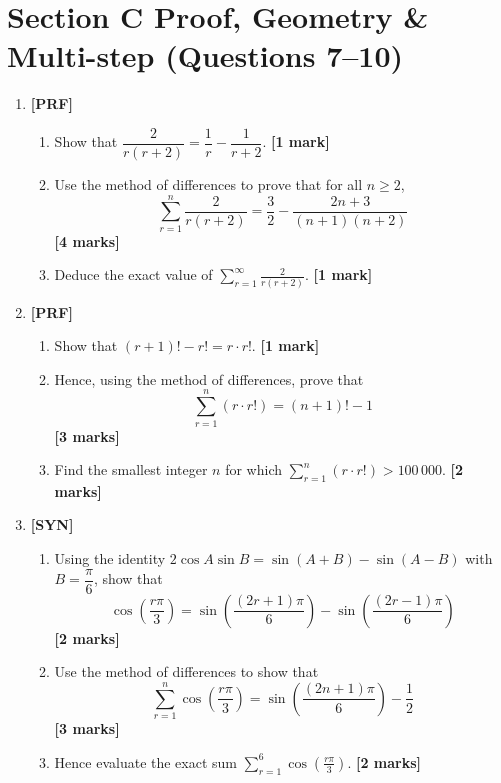 \documentclass[11pt,a4paper]{article}
\begin{document}
\section*{Section C \quad Proof, Geometry \& Multi-step \hfill{\normalfont\footnotesize(Questions 7--10)}}
\begin{enumerate}[resume]

\item \textbf{[PRF]} 
\begin{enumerate}[label=(\alph*)]
  \item Show that $\dfrac{2}{r(r+2)} = \dfrac{1}{r} - \dfrac{1}{r+2}$. \hfill{\textbf{[1 mark]}}
  \item Use the method of differences to prove that for all $n \ge 2$,
  \[
  \sum_{r=1}^n \frac{2}{r(r+2)} = \frac{3}{2} - \frac{2n+3}{(n+1)(n+2)}
  \]
  \hfill{\textbf{[4 marks]}}
  \item Deduce the exact value of $\displaystyle\sum_{r=1}^\infty \frac{2}{r(r+2)}$. \hfill{\textbf{[1 mark]}}
\end{enumerate}

\item \textbf{[PRF]} 
\begin{enumerate}[label=(\alph*)]
  \item Show that $(r+1)! - r! = r \cdot r!$. \hfill{\textbf{[1 mark]}}
  \item Hence, using the method of differences, prove that
  \[
  \sum_{r=1}^n (r \cdot r!) = (n+1)! - 1
  \]
  \hfill{\textbf{[3 marks]}}
  \item Find the smallest integer $n$ for which $\displaystyle\sum_{r=1}^n (r \cdot r!) > 100\,000$. \hfill{\textbf{[2 marks]}}
\end{enumerate}

\item \textbf{[SYN]} 
\begin{enumerate}[label=(\alph*)]
  \item Using the identity $2\cos A \sin B = \sin(A+B) - \sin(A-B)$ with $B = \dfrac{\pi}{6}$, show that
  \[
  \cos\left(\frac{r\pi}{3}\right) = \sin\left(\frac{(2r+1)\pi}{6}\right) - \sin\left(\frac{(2r-1)\pi}{6}\right)
  \]
  \hfill{\textbf{[2 marks]}}
  \item Use the method of differences to show that
  \[
  \sum_{r=1}^n \cos\left(\frac{r\pi}{3}\right) = \sin\left(\frac{(2n+1)\pi}{6}\right) - \frac{1}{2}
  \]
  \hfill{\textbf{[3 marks]}}
  \item Hence evaluate the exact sum $\displaystyle\sum_{r=1}^{6} \cos\left(\frac{r\pi}{3}\right)$. \hfill{\textbf{[2 marks]}}
\end{enumerate}


\end{enumerate}
\end{document}
